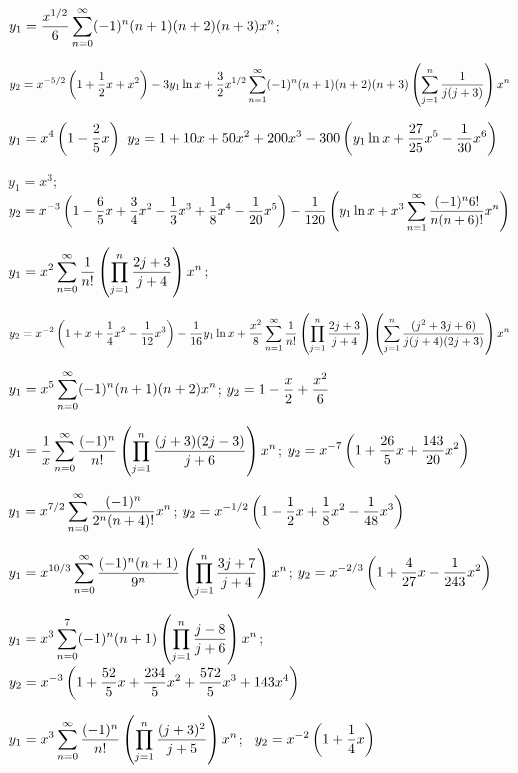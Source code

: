 $\displaystyle{y_{1}=\frac{x^{1/2}}{6}\sum_{n=0}^{\infty}(-1)^{n}(n+1)(n+2)(n+3)x^{n}}$;\;

\quad\;  \;
$\displaystyle{y_{2}=x^{-5/2}\left(1+\frac{1}{2}x+x^{2}\right)-3y_{1}\ln x
+\frac{3}{2}x^{1/2}\sum_{n=1}^{\infty}(-1)^{n}(n+1)(n+2)(n+3)
\left(\sum_{j=1}^{n}\frac{1}{j(j+3)}\right)x^{n}}$

$\displaystyle{y_{1}=x^{4}\left(1-\frac{2}{5}x\right)}$\;
$\displaystyle{y_{2}=1+10x+50x^{2}+200x^{3}-300\left(y_{1}\ln
x+\frac{27}{25}x^{5}-\frac{1}{30}x^{6}\right)}$

$y_{1}=x^{3}$;\;   $y_{2}=\displaystyle{x^{-3}\left(1-\frac{6}{5}x+\frac{3}{4}x^{2}-\frac{1}{3}x^{3}
+\frac{1}{8}x^{4}-\frac{1}{20}x^{5}\right)
-\frac{1}{120}\left(y_{1}\ln x+x^{3}\sum_{n=1}^{\infty}\frac{(-1)^{n}6!}{n(n+6)!}
x^{n}\right)}$

$\displaystyle{y_{1}=x^{2}\sum_{n=0}^{\infty}\frac{1}{n!}\left(\prod_{j=1}^{n}\frac{2j+3}{j+4}\right)x^{n}}$;\;

\quad\;  \;
$\displaystyle{y_{2}=x^{-2}\left(1+x+\frac{1}{4}x^{2}-\frac{1}{12}x^{3}\right)-\frac{1}{16}
y_{1}\ln x+\frac{x^{2}}{8}\sum_{n=1}^{\infty}\frac{1}{n!}\left(\prod_{j=1}^{n}\frac{2j+3}{j+4}
\right)\left(\sum_{j=1}^{n}\frac{(j^{2}+3j+6)}{j(j+4)(2j+3)}\right)x^{n}}$

$y_{1}=\displaystyle{x^{5}\sum_{n=0}^{\infty}(-1)^{n}(n+1)(n+2)x^{n}}$;\;
$y_{2}=\displaystyle{1-\frac{x}{2}+\frac{x^{2}}{6}}$

$y_{1}=\displaystyle{\frac{1}{x}\sum_{n=0}^{\infty}\frac{(-1)^{n}}{n!}\left(\prod_{j=1}^{n}\frac{(j+3)(2j-3)}{j+6}\right)x^{n}}$;\;
$y_{2}=\displaystyle{x^{-7}\left(1+\frac{26}{5}x+\frac{143}{20}x^{2}\right)}$

$y_{1}=\displaystyle{x^{7/2}\sum_{n=0}^{\infty}\frac{(-1)^{n}}{2^{n}(n+4)!}x^{n}}$;\;
$y_{2}=\displaystyle{x^{-1/2}\left(1-\frac{1}{2}x+\frac{1}{8}x^{2}-\frac{1}{48}x^{3}\right)}$

$y_{1}=\displaystyle{x^{10/3}\sum_{n=0}^{\infty}\frac{(-1)^{n}(n+1)}{9^{n}}\left(\prod_{j=1}^{n}
\frac{3j+7}{j+4}\right)x^{n}}$;\;
$y_{2}=\displaystyle{x^{-2/3}\left(1+\frac{4}{27}x-\frac{1}{243}x^{2}\right)}$

$y_{1}=\displaystyle{x^{3}\sum_{n=0}^{7}(-1)^{n}(n+1)\left(\prod_{j=1}^{n}\frac{j-8}{j+6}\right)x^{n}}$;\;
$y_{2}=\displaystyle x^{-3}\left(1+\frac{52}{5}x+\frac{234}{5}x^{2}+\frac{572}{5}x^{3}+
143x^{4}\right)$

$y_{1}=\displaystyle{x^{3}\sum_{n=0}^{\infty}\frac{(-1)^{n}}{n!}\left(\prod_{j=1}^{n}\frac{(j+3)^{2}}{j+5}\right)x^{n}}$;\;   \, $y_{2}=\displaystyle{x^{-2}\left(1+\frac{1}{4}x\right)}$

